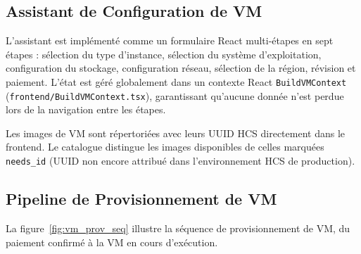 \subsection{Assistant de Configuration de VM}

L'assistant est implémenté comme un formulaire React multi-étapes en sept étapes :
sélection du type d'instance, sélection du système d'exploitation, configuration du
stockage, configuration réseau, sélection de la région, révision et paiement. L'état
est géré globalement dans un contexte React \texttt{BuildVMContext}
(\texttt{frontend/BuildVMContext.tsx}), garantissant qu'aucune donnée n'est perdue
lors de la navigation entre les étapes.


Les images de VM sont répertoriées avec leurs UUID HCS directement dans le frontend.
Le catalogue distingue les images disponibles de celles marquées \texttt{needs\_id}
(UUID non encore attribué dans l'environnement HCS de production).

\subsection{Pipeline de Provisionnement de VM}

La figure~\ref{fig:vm_prov_seq} illustre la séquence de provisionnement de VM,
du paiement confirmé à la VM en cours d'exécution.

